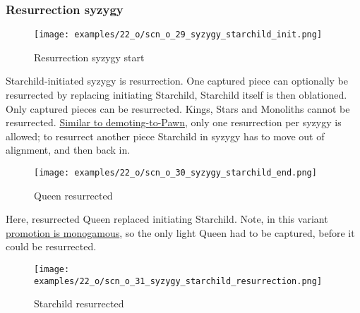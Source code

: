 \subsubsection*{Resurrection syzygy}

\vspace*{-1.5\baselineskip}
\noindent
\begin{figure}[!h]
\texttt{[image: examples/22\_o/scn\_o\_29\_syzygy\_starchild\_init.png]}
\vspace*{-1.4\baselineskip}
\caption{Resurrection syzygy start}
\label{fig:scn_o_29_syzygy_starchild_init}
\end{figure}

\vspace*{-0.5\baselineskip}
Starchild-initiated syzygy is resurrection. One captured piece can optionally be
resurrected by replacing initiating Starchild, Starchild itself is then oblationed.
Only captured pieces can be resurrected. Kings, Stars and Monoliths cannot be
resurrected.
\hyperref[fig:scn_d_20_syzygy_2_stars_steps]{Similar to demoting-to-Pawn}, only one
resurrection per syzygy is allowed; to resurrect another piece Starchild in syzygy
has to move out of alignment, and then back in.

\clearpage %

\vspace*{-2.1\baselineskip}
\noindent
\begin{figure}[!h]
\texttt{[image: examples/22\_o/scn\_o\_30\_syzygy\_starchild\_end.png]}
\caption{Queen resurrected}
\label{fig:scn_o_30_syzygy_starchild_end}
\end{figure}

Here, resurrected Queen replaced initiating Starchild. Note, in this variant
\hyperref[sec:One/Promotion]{promotion is monogamous}, so the only light Queen
had to be captured, before it could be resurrected.

\clearpage %

\vspace*{-2.1\baselineskip}
\noindent
\begin{figure}[!h]
\texttt{[image: examples/22\_o/scn\_o\_31\_syzygy\_starchild\_resurrection.png]}
\caption{Starchild resurrected}
\label{fig:scn_o_31_syzygy_starchild_resurrection}
\end{figure}

